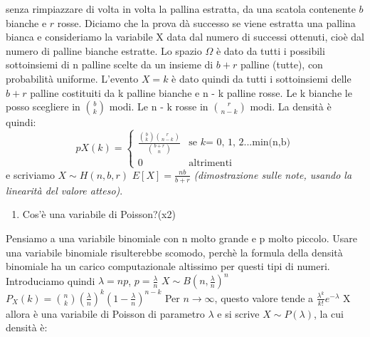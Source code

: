 senza rimpiazzare di volta in volta la pallina estratta, da una scatola contenente $b$ bianche e $r$ rosse. Diciamo
che la prova dà successo se viene estratta una pallina bianca e consideriamo la variabile X data
dal numero di successi ottenuti, cioè dal numero di palline bianche estratte.
Lo spazio $\Omega$ è dato da tutti i possibili sottoinsiemi di n palline scelte da un insieme
di $b + r$ palline (tutte), con probabilità uniforme. \newline
L’evento $X = k$ è dato quindi da tutti i sottoinsiemi delle $b + r$ palline costituiti da k palline bianche e n - k palline rosse. Le k bianche le posso scegliere in $\binom{b}{k}$ modi. Le n - k rosse in $\binom{r}{n-k}$ modi.\newline
La densità è quindi:
\[pX(k)= \begin{cases}\frac{\binom{b}{k} \binom{r}{n-k}}{\binom{b+r}{n}}
& \mbox{se } k\mbox{= 0, 1, 2...min(n,b)} \\ 0 & \mbox{altrimenti } \end{cases} \]
e scriviamo $X \sim H(n,b,r)$\newline
$E[X] = \frac{nb}{b+r}$  \textit{(dimostrazione sulle note, usando la linearità del valore atteso)}.
\begin{enumerate}[resume]\bfseries
\item Cos'è una variabile di Poisson?(x2)
\end{enumerate}
Pensiamo a una variabile binomiale con n molto grande e p molto piccolo. Usare una variabile binomiale risulterebbe scomodo, perchè la formula della densità binomiale ha un carico computazionale altissimo per questi tipi di numeri. Introduciamo quindi $\lambda = np$, $p= \frac{\lambda}{n}$\newline
$X \sim B(n,\frac{\lambda}{n})^n$\newline
$P_X(k)= \binom{n}{k} (\frac{\lambda}{n})^k (1- \frac{\lambda}{n})^{n-k}$\newline
Per $n \to \infty $, questo valore tende a $ \frac{\lambda^k}{k!} e^{-\lambda}$
X allora è una variabile di Poisson di parametro $\lambda$ e si scrive $X \sim P(\lambda)$, la cui densità è:

